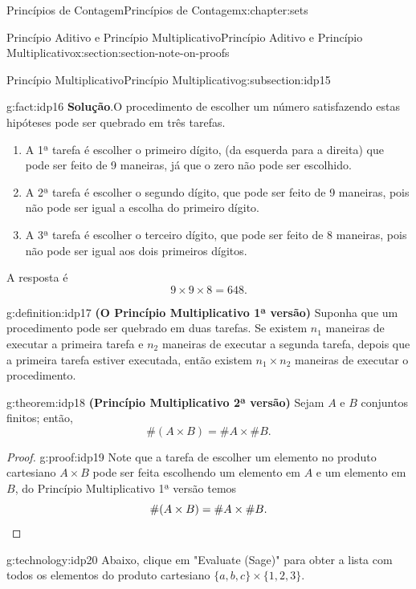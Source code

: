 \documentclass[oneside,10pt,]{book}
\newcommand{\blocktitlefont}{\relax}
\newcommand{\terminology}[1]{\textbf{#1}}
\newcommand{\qedhere}{\relax}
\numberwithin{equation}{section}
\begin{document}
\begin{chapterptx}{Princípios de Contagem}{}{Princípios de Contagem}{}{}{x:chapter:sets}
\begin{sectionptx}{Princípio Aditivo e Princípio Multiplicativo}{}{Princípio Aditivo e Princípio Multiplicativo}{}{}{x:section:section-note-on-proofs}
\begin{subsectionptx}{Princípio Multiplicativo}{}{Princípio Multiplicativo}{}{}{g:subsection:idp15}
\begin{fact}{}{}{g:fact:idp16}
\textbf{\blocktitlefont Solução}.\quad{}O procedimento de escolher um número satisfazendo estas hipóteses pode ser quebrado em três tarefas.%
\begin{enumerate}
\item{}A 1ª tarefa é escolher o primeiro dígito, (da esquerda para a direita) que pode ser feito de 9 maneiras, já que o zero não pode ser escolhido.%
\item{}A 2ª tarefa é escolher o segundo dígito, que pode ser feito de 9 maneiras, pois não pode ser igual a escolha do primeiro dígito.%
\item{}A 3ª tarefa é escolher o terceiro dígito, que pode ser feito de 8 maneiras, pois não pode ser igual aos dois primeiros dígitos.%
\end{enumerate}
A resposta é%
\begin{equation*}
9\times 9\times 8 = 648\text{.}
\end{equation*}
%
\end{fact}
\begin{definition}{}{g:definition:idp17}%
\terminology{(O Princípio Multiplicativo 1ª versão)} Suponha que um procedimento pode ser quebrado em duas tarefas. Se existem \(n_1\) maneiras de executar a primeira tarefa e \(n_2\) maneiras de executar a segunda tarefa, depois que a primeira tarefa estiver executada, então existem \(n_1\times n_2\) maneiras de executar o procedimento.%
\end{definition}
\begin{theorem}{}{}{g:theorem:idp18}%
\terminology{(Princípio Multiplicativo 2ª versão)} Sejam \(A\) e \(B\) conjuntos finitos; então,%
\begin{equation*}
\#(A\times B) = \#A\times \#B.
\end{equation*}
%
\end{theorem}
\begin{proof}{}{g:proof:idp19}
Note que a tarefa de escolher um elemento no produto cartesiano \(A\times B\) pode ser feita escolhendo um elemento em \(A\) e um elemento em \(B\), do Princípio Multiplicativo 1ª versão temos%
\begin{equation*}
\#(A\times B) = \#A\times \#B.\qedhere
\end{equation*}
%
\end{proof}
\begin{technology}{}{g:technology:idp20}%
Abaixo, clique em "Evaluate (Sage)" para obter a lista com todos os elementos do produto cartesiano \(\{a, b, c\}\times\{1, 2, 3\}\).%
\begin{sageinput}

\end{sageinput}
\end{technology}
\end{subsectionptx}
\end{sectionptx}
\end{chapterptx}
\end{document}
